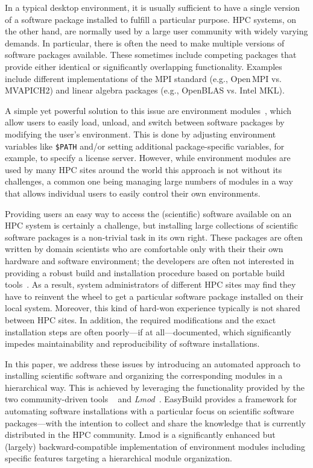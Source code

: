 In a typical desktop environment, it is usually sufficient to have a
single version of a software package installed to fulfill a particular purpose. HPC
systems, on the other hand, are normally used by a large user community with widely varying
demands. In particular, there is often the need to make multiple versions of
software packages available. These sometimes include competing packages
that provide either identical or significantly overlapping functionality. Examples include
 different implementations of the MPI standard (e.g., Open\,MPI vs.
MVAPICH2) and linear algebra packages (e.g., OpenBLAS vs. Intel MKL).

A simple yet powerful solution to this issue are environment
modules~\cite{furlani91,furlani96,eadline,laytonEM1}, which allow
users to easily load, unload, and switch between software packages by
modifying the user's environment. This is done by adjusting environment
variables like \texttt{\small\$PATH} and/or setting additional package-specific
variables, for example, to specify a license server.
However, while environment modules are used by many
HPC sites around the world this approach is not without its challenges,
a common one being managing large numbers of modules in a way that allows individual
users to easily control their own environments.

Providing users an easy way to access the (scientific) software
available on an HPC system is certainly a challenge, but installing large collections
of scientific software packages is a
non-trivial task in its own right. These packages are often written by domain
scientists who are comfortable only with their their own hardware and software
environment; the developers are often not interested in providing a robust
build and installation procedure based on portable build
tools~\cite{Dubois03}. As a result, system administrators of different HPC sites may
find they have to reinvent the wheel to
get a particular software package installed on their local system. Moreover, this
kind of hard-won experience typically is not shared between HPC sites. In
addition, the required modifications and the exact installation steps are
often poorly---if at all---documented, which significantly impedes
maintainability and reproducibility of software installations.

In this paper, we address these issues by introducing an automated approach to
installing scientific software and organizing the corresponding modules in a
hierarchical way. This is achieved by leveraging the functionality provided by the
two community-driven tools \emph{\easybuild{}}~\cite{EasyBuildSC12} and
\emph{Lmod}~\cite{taccLmod}. EasyBuild provides a
framework for automating software installations with a particular focus on
scientific software packages---with the intention to collect and share the
knowledge that is currently distributed in the HPC community.
Lmod is a significantly enhanced but
(largely) backward-compatible implementation of environment modules including specific
features targeting a hierarchical module organization.


